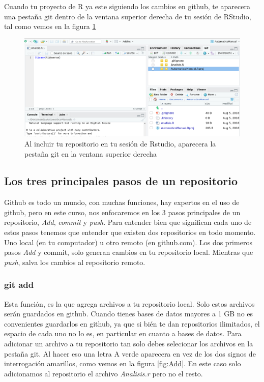 \documentclass[]{book}
\begin{document}
Cuando tu proyecto de R ya este siguiendo los cambios en github, te
aparecera una pestaña git dentro de la ventana superior derecha de tu
sesión de RStudio, tal como vemos en la figura \ref{fig:GitPan}

\begin{figure}

{\centering \includegraphics[width=0.8\linewidth]{GitPan} 

}

\caption{Al incluir tu repositorio en tu sesión de Rstudio, aparecera la pestaña git en la ventana superior derecha}\label{fig:GitPan}
\end{figure}

\hypertarget{los-tres-principales-pasos-de-un-repositorio}{%
\subsection{Los tres principales pasos de un
repositorio}\label{los-tres-principales-pasos-de-un-repositorio}}

Github es todo un mundo, con muchas funciones, hay expertos en el uso de
github, pero en este curso, nos enfocaremos en los 3 pasos principales
de un repositorio, \emph{Add}, \emph{commit} y \emph{push}. Para
entender bien que significan cada uno de estos pasos tenemos que
entender que existen dos repositorios en todo momento. Uno local (en tu
computador) u otro remoto (en github.com). Los dos primeros pasos
\emph{Add} y commit, solo generan cambios en tu repositorio local.
Mientras que \emph{push}, salva los cambios al repositorio remoto.

\hypertarget{git-add}{%
\subsubsection{git add}\label{git-add}}

Esta función, es la que agrega archivos a tu repositorio local. Solo
estos archivos serán guardados en github. Cuando tienes bases de datos
mayores a 1 GB no es convenientes guardarlos en github, ya que si bién
te dan repositorios ilimitados, el espacio de cada uno no lo es, en
particular en cuanto a bases de datos. Para adicionar un archivo a tu
repositorio tan solo debes selecionar los archivos en la pestaña git. Al
hacer eso una letra A verde aparecera en vez de los dos signos de
interrogación amarillos, como vemos en la figura \ref{fig:Add}. En este
caso solo adicionamos al repositorio el archivo \emph{Analisis.r} pero
no el resto.
\end{document}
